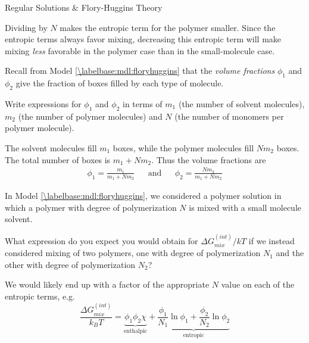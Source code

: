 \begin{activity}{Regular Solutions \& Flory-Huggins Theory}
\begin{ctqs}
\begin{solution}[2in]{}
				Dividing by $N$ makes the entropic term for the polymer smaller.  Since the entropic terms always favor mixing, decreasing this entropic term will make mixing \emph{less} favorable in the polymer case than in the small-molecule case.
			
			\end{solution}
			
\end{ctqs}

\begin{exercises}
			
		\exercise Recall from Model \ref{\labelbase:mdl:floryhuggins} that the \emph{volume fractions} $\phi_1$ and $\phi_2$ give the fraction of boxes filled by each type of molecule.
		
		Write expressions for $\phi_1$ and $\phi_2$ in terms of $m_1$ (the number of solvent molecules), $m_2$ (the number of polymer molecules) and $N$ (the number of monomers per polymer molecule).
				
					\begin{solution}{}
						The solvent molecules fill $m_1$ boxes, while the polymer molecules fill $Nm_2$ boxes.  The total number of boxes is $m_1 + Nm_2$.  Thus the volume fractions are
						\begin{align*}
							\phi_1 = \frac{m_1}{m_1 + Nm_2} && \text{and} && \phi_2 = \frac{Nm_2}{m_1 + Nm_2}
						\end{align*}
					\end{solution}
			
		\exercise In Model \ref{\labelbase:mdl:floryhuggins}, we considered a polymer solution in which a polymer with degree of polymerization $N$ is mixed with a small molecule solvent.
		
			What expression do you expect you would obtain for $\Delta G_{mix}^{(int)}/kT$ if we instead considered mixing of two polymers, one with degree of polymerization $N_1$ and the other with degree of polymerization $N_2$?
				
					\begin{solution}{}
						We would likely end up with a factor of the appropriate $N$ value on each of the entropic terms, e.g.
						\begin{equation*}
							\frac{\Delta G_{mix}^{(int)}}{k_B T} = \underbrace{\phi_1 \phi_2 \chi}_{\text{enthalpic}} + \underbrace{\frac{\phi_1}{N_1} \ln \phi_1 + \frac{\phi_2}{N_2} \ln \phi_2}_{\text{entropic}}
							\end{equation*}
						

\end{solution}
\end{exercises}
\end{activity}
